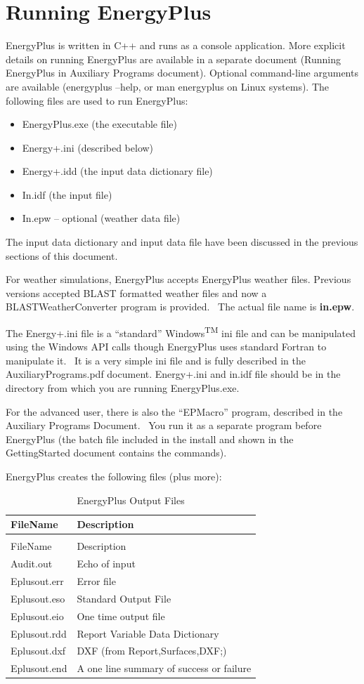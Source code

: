 \chapter{Running EnergyPlus}\label{running-energyplus}

EnergyPlus is written in C++ and runs as a console application. More explicit details on running EnergyPlus are available in a separate document (Running EnergyPlus in Auxiliary Programs document). Optional command-line arguments are available (energyplus --help, or man energyplus on Linux systems). The following files are used to run EnergyPlus:

\begin{itemize}
\item
  EnergyPlus.exe (the executable file)
\item
  Energy+.ini (described below)
\item
  Energy+.idd (the input data dictionary file)
\item
  In.idf (the input file)
\item
  In.epw -- optional (weather data file)
\end{itemize}

The input data dictionary and input data file have been discussed in the previous sections of this document.

For weather simulations, EnergyPlus accepts EnergyPlus weather files. Previous versions accepted BLAST formatted weather files and now a BLASTWeatherConverter program is provided.~ The actual file name is \textbf{in.epw}.

The Energy+.ini file is a ``standard'' Windows\textsuperscript{TM} ini file and can be manipulated using the Windows API calls though EnergyPlus uses standard Fortran to manipulate it.~ It is a very simple ini file and is fully described in the AuxiliaryPrograms.pdf document. Energy+.ini and in.idf file should be in the directory from which you are running EnergyPlus.exe.

For the advanced user, there is also the ``EPMacro'' program, described in the Auxiliary Programs Document.~ You run it as a separate program before EnergyPlus (the batch file included in the install and shown in the GettingStarted document contains the commands).

EnergyPlus creates the following files (plus more):

\begin{longtable}[c]{@{}ll@{}}
\caption{EnergyPlus Output Files \label{table:energyplus-output-files}} \tabularnewline
\toprule
FileName & Description \tabularnewline
\midrule
\endfirsthead

\caption[]{EnergyPlus Output Files} \tabularnewline
\toprule
FileName & Description \tabularnewline
\midrule
\endhead

Audit.out & Echo of input \tabularnewline
Eplusout.err & Error file \tabularnewline
Eplusout.eso & Standard Output File \tabularnewline
Eplusout.eio & One time output file \tabularnewline
Eplusout.rdd & Report Variable Data Dictionary \tabularnewline
Eplusout.dxf & DXF (from Report,Surfaces,DXF;) \tabularnewline
Eplusout.end & A one line summary of success or failure \tabularnewline
\bottomrule
\end{longtable}


